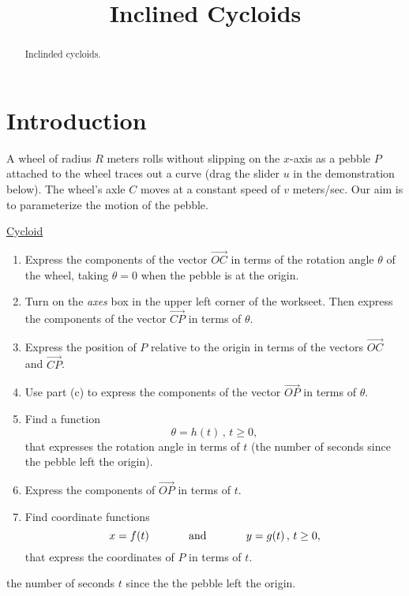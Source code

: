 \documentclass{ximera}
\title{Inclined Cycloids}
\begin{document}
\begin{abstract}
Inclinded cycloids.
\end{abstract}
\maketitle

\section{Introduction}

\begin{exploration}  \label{Exhjjjjnbbbbbr}

A wheel of radius $R$ meters rolls without slipping on the $x$-axis as a pebble $P$ attached to the wheel traces out a curve (drag the slider $u$ in the demonstration below). The wheel's axle $C$ moves  at a constant speed of $v$ meters/sec. Our aim is to parameterize the motion of the pebble.


\href{https://www.geogebra.org/classic/vxbjccpa}{Cycloid}

 
\begin{onlineOnly}
    \begin{center}
\end{center}
\end{onlineOnly}


\begin{enumerate}
\item Express the components of the vector $\overrightarrow{OC}$ in terms of the rotation angle $\theta$ of the wheel, taking $\theta=0$ when the pebble is at the origin.

\item Turn on the \emph{axes} box in the upper left corner of the workseet. Then express the components of the vector $\overrightarrow{CP}$ in terms of $\theta$.

\item Express the position of $P$ relative to the origin in terms of the vectors $\overrightarrow{OC}$ and $\overrightarrow{CP}$.

\item Use part (c) to express the components of the vector $\overrightarrow{OP}$ in terms of $\theta$.

\item Find a function 
\[
   \theta = h(t)  \, , \, t\geq 0, 
\]
that expresses the rotation angle in terms of $t$ (the number of seconds since the pebble left the origin).

\item Express the components of $\overrightarrow{OP}$ in terms of $t$.

\item Find coordinate functions
\[
    x=f(t)   \hskip 0.5in \text{and} \hskip 0.5in y=g(t) \, , \, t\geq 0 ,
\]
that express the coordinates of $P$ in terms of $t$.
\end{enumerate}



the number of seconds $t$ since the the pebble left the origin.

\end{exploration}
\end{document}
